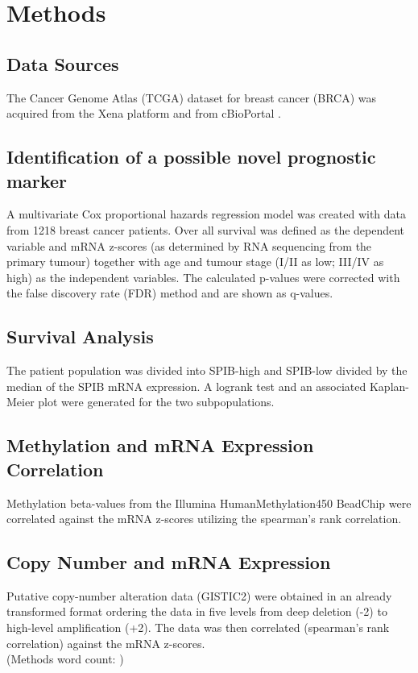 \section{Methods}
\countem

\subsection{Data Sources}

The Cancer Genome Atlas (TCGA) dataset for breast cancer (BRCA)\cite{Ciriello2015} was acquired from the Xena platform \cite{Goldman2018} and from cBioPortal \cite{Cerami2012}.

\subsection{Identification of a possible novel prognostic marker}
A multivariate Cox proportional hazards regression model was created with data from 1218 breast cancer patients.
Over all survival was defined as the dependent variable and mRNA z-scores (as determined by RNA sequencing from the primary tumour) together with age and tumour stage (I/II as low; III/IV as high) as the independent variables.
The calculated p-values were corrected with the false discovery rate (FDR) method and are shown as q-values.

\subsection{Survival Analysis}

The patient population was divided into SPIB-high and SPIB-low divided by the median of the SPIB mRNA expression.
A logrank test and an associated Kaplan-Meier plot were generated for the two subpopulations.

\subsection{Methylation and mRNA Expression Correlation}

Methylation beta-values from the Illumina HumanMethylation450 BeadChip were correlated against the mRNA z-scores utilizing the spearman's rank correlation.

\subsection{Copy Number and mRNA Expression}

Putative copy-number alteration data (GISTIC2) were obtained in an already transformed format ordering the data in five levels from deep deletion (-2) to high-level amplification (+2).
The data was then correlated (spearman's rank correlation) against the mRNA z-scores.
\endcountem \\
(Methods word count: \thewordcount{})